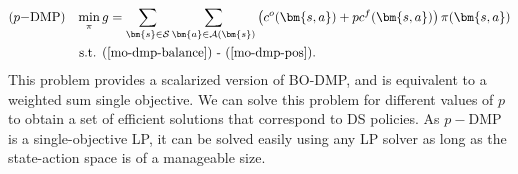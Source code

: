 \documentclass[11pt,authoryear,a4paper]{article}
\theoremstyle{definition}
\begin{document}


\begin{align}
    &\text{($p-$DMP)}&\min_\pi\, &g = \sum_{\bm{s}\in \mathcal{S}}\sum_{\bm{a}\in \mathcal{A}(\bm{s})}\left(c^o(\bm{s,a}) + pc^f(\bm{s,a})\right)\pi(\bm{s,a}) \label{p-dmp-obj1}\\
    &&\text{s.t. } &\text{(\ref{mo-dmp-balance}) - (\ref{mo-dmp-pos})}.
\end{align}
This problem provides a scalarized version of BO-DMP, and is equivalent to a weighted sum single objective. We can solve this problem for different values of $p$ to obtain a set of efficient solutions that correspond to DS policies. As $p-$DMP is a single-objective LP, it can be solved easily using any LP solver as long as the state-action space is of a manageable size. 
\end{document}
